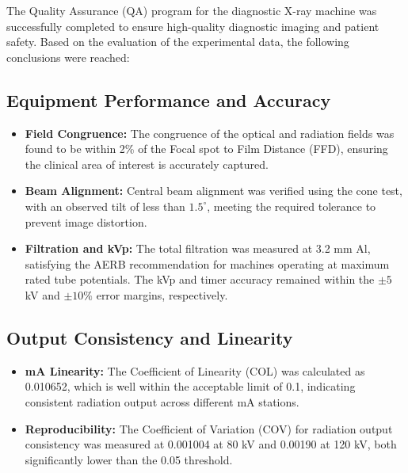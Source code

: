 The Quality Assurance (QA) program for the diagnostic X-ray machine was successfully completed to ensure high-quality diagnostic imaging and patient safety. Based on the evaluation of the experimental data, the following conclusions were reached:

\subsection{Equipment Performance and Accuracy}
\begin{itemize}
    \item \textbf{Field Congruence:} The congruence of the optical and radiation fields was found to be within 2\% of the Focal spot to Film Distance (FFD), ensuring the clinical area of interest is accurately captured.
    \item \textbf{Beam Alignment:} Central beam alignment was verified using the cone test, with an observed tilt of less than $1.5^{\circ}$, meeting the required tolerance to prevent image distortion.
    \item \textbf{Filtration and kVp:} The total filtration was measured at 3.2 mm Al, satisfying the AERB recommendation for machines operating at maximum rated tube potentials. The kVp and timer accuracy remained within the $\pm 5$ kV and $\pm 10\%$ error margins, respectively.
\end{itemize}

\subsection{Output Consistency and Linearity}
\begin{itemize}
    \item \textbf{mA Linearity:} The Coefficient of Linearity (COL) was calculated as 0.010652, which is well within the acceptable limit of 0.1, indicating consistent radiation output across different mA stations.
    \item \textbf{Reproducibility:} The Coefficient of Variation (COV) for radiation output consistency was measured at 0.001004 at 80 kV and 0.00190 at 120 kV, both significantly lower than the 0.05 threshold.
\end{itemize}


